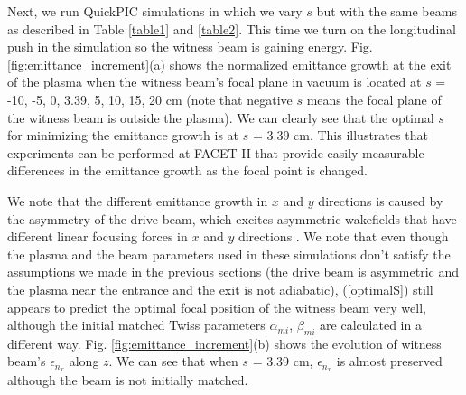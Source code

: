 \documentclass[%
reprint, superscriptaddress,
 amsmath,amssymb, aps,
prstab,
]{revtex4-2}
\begin{document}
Next, we run QuickPIC simulations in which we vary $s$ but with the
same beams as described in Table \ref{table1} and \ref{table2}. This time we turn on the longitudinal push in the simulation so the witness beam is gaining energy. Fig.
\ref{fig:emittance_increment}(a) shows the normalized emittance growth at the
exit of the plasma when the witness beam's focal plane in vacuum is
located at $s$ = -10, -5, 0, 3.39, 5, 10, 15, 20 cm (note that
negative $s$ means the focal plane of the witness beam is outside the
plasma).
We can clearly see that the optimal $s$ for minimizing the emittance growth
is at $s$ = 3.39 cm. This illustrates that experiments can be performed at FACET II that provide easily measurable differences in the emittance growth as the focal point is changed. %


We note that the different emittance growth in $x$
and $y$ directions is caused by the asymmetry of the drive beam, which excites asymmetric wakefields that
have different linear focusing forces in $x$ and $y$ directions
\cite{Lance}. We note that even though the plasma and the beam parameters used in these simulations don't satisfy the assumptions we made in the previous sections (the drive beam is asymmetric and the plasma near the entrance and the exit is not adiabatic), (\ref{optimalS}) still appears to predict the optimal focal position of the witness beam very well, although the initial matched Twiss parameters $\alpha_{mi}$, $\beta_{mi}$ are calculated in a different way.
Fig. \ref{fig:emittance_increment}(b) shows the evolution of witness beam's $\epsilon_{n_x}$ along $z$. We can see that when $s$ = 3.39 cm, $\epsilon_{n_x}$ is almost preserved although the beam is not initially matched.
\end{document}
